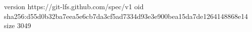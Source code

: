 version https://git-lfs.github.com/spec/v1
oid sha256:d55d0b32ba7eea5e6cb7da3cf5ad7334d93e3e900bea15da7de1264148868e14
size 3049
